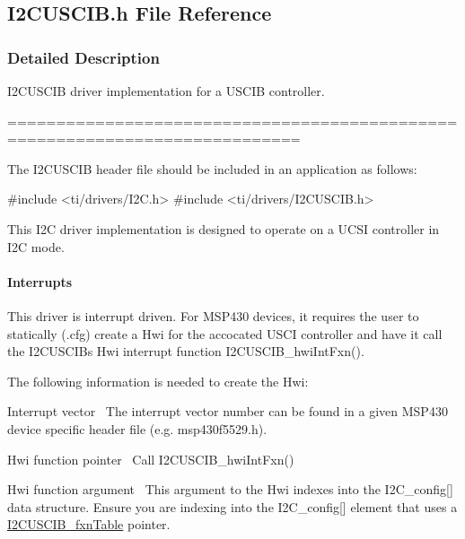 \subsection{I2\+C\+U\+S\+C\+I\+B.\+h File Reference}
\label{_i2_c_u_s_c_i_b_8h}


\subsubsection{Detailed Description}
I2\+C\+U\+S\+C\+I\+B driver implementation for a U\+S\+C\+I\+B controller. 

============================================================================

The I2\+C\+U\+S\+C\+I\+B header file should be included in an application as follows\+: 
\begin{DoxyCode}
\textcolor{preprocessor}{#include <ti/drivers/I2C.h>}
\textcolor{preprocessor}{#include <ti/drivers/I2CUSCIB.h>}
\end{DoxyCode}


This I2\+C driver implementation is designed to operate on a U\+C\+S\+I controller in I2\+C mode.

\paragraph*{Interrupts}

This driver is interrupt driven. For M\+S\+P430 devices, it requires the user to statically (.cfg) create a Hwi for the accocated U\+S\+C\+I controller and have it call the I2\+C\+U\+S\+C\+I\+B\textquotesingle{}s Hwi interrupt function I2\+C\+U\+S\+C\+I\+B\+\_\+hwi\+Int\+Fxn().

The following information is needed to create the Hwi\+:
\begin{DoxyEnumerate}
\item Interrupt vector~\newline
 The interrupt vector number can be found in a given M\+S\+P430 device specific header file (e.\+g. msp430f5529.\+h).
\item Hwi function pointer~\newline
 Call I2\+C\+U\+S\+C\+I\+B\+\_\+hwi\+Int\+Fxn()
\item Hwi function argument~\newline
 This argument to the Hwi indexes into the I2\+C\+\_\+config\mbox{[}\mbox{]} data structure. Ensure you are indexing into the I2\+C\+\_\+config\mbox{[}\mbox{]} element that uses a \hyperlink{_i2_c_u_s_c_i_b_8h_a72eb489c9beee32e652431265a234cbd}{I2\+C\+U\+S\+C\+I\+B\+\_\+fxn\+Table} pointer.
\end{DoxyEnumerate}



